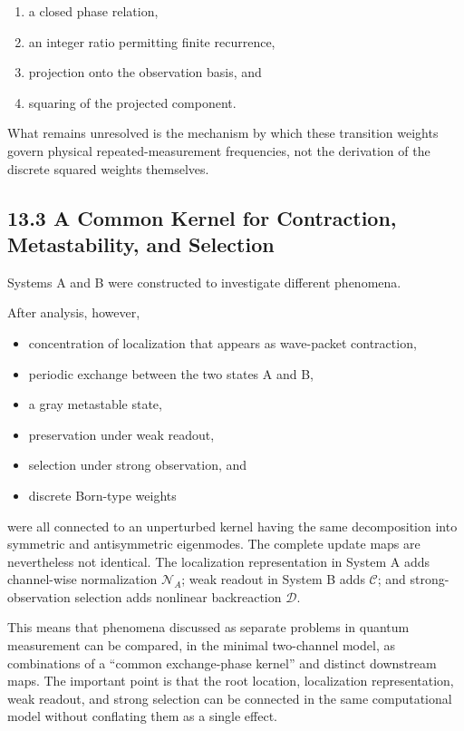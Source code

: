\documentclass[
  a4paper,
  10pt]{article}
\providecommand{\tightlist}{%
  \setlength{\itemsep}{0pt}\setlength{\parskip}{0pt}}
\begin{document}
\begin{enumerate}
\def\labelenumi{\arabic{enumi}.}
\tightlist
\item
  a closed phase relation,
\item
  an integer ratio permitting finite recurrence,
\item
  projection onto the observation basis, and
\item
  squaring of the projected component.
\end{enumerate}

What remains unresolved is the mechanism by which these transition
weights govern physical repeated-measurement frequencies, not the
derivation of the discrete squared weights themselves.

\subsection{13.3 A Common Kernel for Contraction, Metastability, and
Selection}\label{133-a-common-kernel-for-contraction-metastability-and-selection}

Systems A and B were constructed to investigate different phenomena.

After analysis, however,

\begin{itemize}
\tightlist
\item
  concentration of localization that appears as wave-packet contraction,
\item
  periodic exchange between the two states A and B,
\item
  a gray metastable state,
\item
  preservation under weak readout,
\item
  selection under strong observation, and
\item
  discrete Born-type weights
\end{itemize}

were all connected to an unperturbed kernel having the same
decomposition into symmetric and antisymmetric eigenmodes. The complete
update maps are nevertheless not identical. The localization
representation in System A adds channel-wise normalization
\(\mathcal N_A\); weak readout in System B adds \(\mathcal C\); and
strong-observation selection adds nonlinear backreaction \(\mathcal D\).

This means that phenomena discussed as separate problems in quantum
measurement can be compared, in the minimal two-channel model, as
combinations of a ``common exchange-phase kernel'' and distinct
downstream maps. The important point is that the root location,
localization representation, weak readout, and strong selection can be
connected in the same computational model without conflating them as a
single effect.
\end{document}
